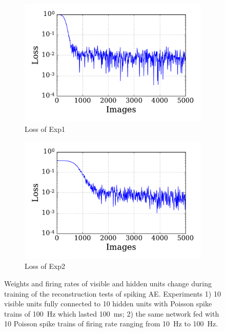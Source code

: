 \begin{figure}
\begin{subfigure}[t]{0.48\textwidth}
		\DIFaddendFL \includegraphics[width=\textwidth]{pics_sdlm/00_exp_SAE_Orig/exp1_mse_nons.pdf}
		\caption{Loss of Exp1}
	\end{subfigure}
	\DIFdelbeginFL %
\DIFdelendFL \DIFaddbeginFL \begin{subfigure}[t]{0.48\textwidth}
		\DIFaddendFL \includegraphics[width=\textwidth]{pics_sdlm/00_exp_SAE_Orig/exp2_mse_nons.pdf}
		\caption{Loss of Exp2}
	\end{subfigure}
	\DIFdelbeginFL %
\DIFdelendFL \DIFaddbeginFL \caption[SAE training of the reconstruction tests.]{\DIFaddendFL Weights and firing rates of visible and hidden units change during training of the reconstruction tests of \DIFaddbeginFL {}\DIFaddendFL spiking AE. 
		Experiments 1) 10 visible units fully connected to 10 hidden units with Poisson spike trains of 100~Hz which lasted 100~ms; 2) the same network fed with 10 Poisson spike trains of firing rate ranging from 10~Hz to 100~Hz.}
	\label{fig:SAE_orig}
\end{figure}

